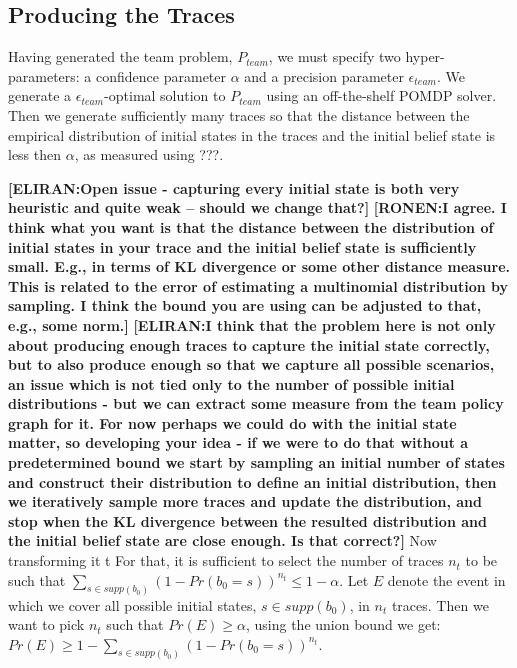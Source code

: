 \documentclass[letterpaper]{article} %
\newcommand{\eliran}[1]{\textbf{[\color{red}ELIRAN:#1]}}
\newcommand{\ronen}[1]{\textbf{[\color{blue}RONEN:#1]}}
\begin{document}
\subsection{Producing the Traces}

Having generated the team problem, $P_{team}$, we 
must specify two hyper-parameters: a confidence parameter $\alpha$ and a precision parameter $\epsilon_{team}$. We generate a $\epsilon_{team}$-optimal solution
to $P_{team}$ using an off-the-shelf POMDP solver.
Then we generate sufficiently many traces so that the distance between the
empirical distribution of initial states in the traces and the initial belief state is less then $\alpha$,
as measured using ???.

\eliran{Open issue - capturing every initial state is both very heuristic and quite weak -- should we change that?}
\ronen{I agree. I think what you want is that the distance between the
distribution of initial states in your trace and the initial belief state is
sufficiently small. E.g., in terms of KL divergence or some other distance measure. This is related to the error of estimating a multinomial distribution by sampling. I think the bound you are using can be adjusted to that,
e.g., some norm.}
\eliran{I think that the problem here is not only about producing enough traces to capture the initial state correctly, but to also produce enough so that we capture all possible scenarios, an issue which is not tied only to the number of possible initial distributions - but we can extract some measure from the team policy graph for it. For now perhaps we could do with the initial state matter, so developing your idea - if we were to do that without a predetermined bound we start by sampling an initial number of states and construct their distribution to define an initial distribution, then we iteratively sample more traces and update the distribution, and stop when the KL divergence between the resulted distribution and the initial belief state are close enough. Is that correct?}
Now transforming it t
For that, it is sufficient to select the number of traces $n_t$ to be such that $\sum_{s\in supp(b_0)}(1-Pr(b_0=s))^{n_t} \leq 1-\alpha$.
Let $E$ denote the event in which we cover all possible initial states, $s \in supp(b_0)$, in $n_t$ traces. Then we want to pick $n_t$ such that $Pr(E)\geq \alpha$, using the union bound we get: $Pr(E)\geq 1-\sum_{s\in supp(b_0)}(1-Pr(b_0=s))^{n_t}$.
\end{document}

